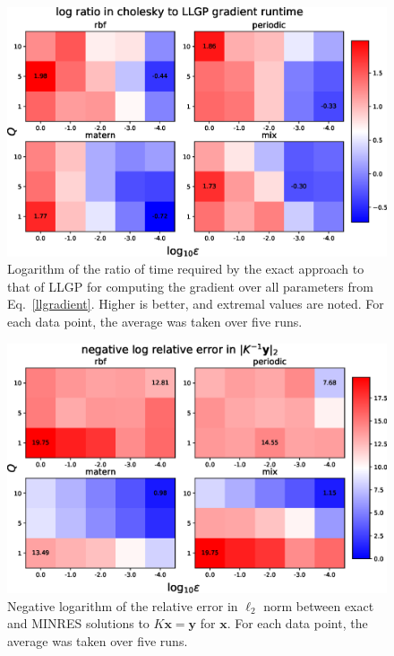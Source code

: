 \documentclass{article}
\def\Tx{\textbf{x}}
\def\Ty{\textbf{y}}
\begin{document}
\begin{figure}[!ht]
\vskip 0.2in
\begin{center}
\centerline{\includegraphics[width=\columnwidth]{time_ratio.eps}}
\caption{Logarithm of the ratio of time required by the exact approach to that of LLGP for computing the gradient over all parameters from Eq.~\ref{llgradient}. Higher is better, and extremal values are noted. For each data point, the average was taken over five runs.}
\label{fig:gradtime}
\end{center}
\vskip -0.2in
\end{figure}

\begin{figure}[!ht]
\vskip 0.2in
\begin{center}
\centerline{\includegraphics[width=\columnwidth]{relalpha_l2.eps}}
\caption{Negative logarithm of the relative error in $\ell_2$ norm between exact and MINRES solutions to $K\Tx=\Ty$ for $\Tx$. For each data point, the average was taken over five runs.}
\label{fig:inverr}
\end{center}
\vskip -0.2in
\end{figure}
\end{document}
